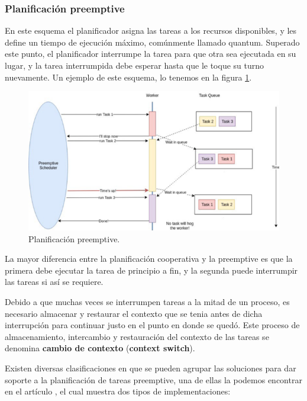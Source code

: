 \subsubsection{Planificación preemptive}

En este esquema el planificador asigna las tareas a los recursos disponibles, y les define un tiempo de ejecución máximo, comúnmente llamado quantum\cite{PreeK}. Superado este punto, el planificador interrumpe la tarea para que otra sea ejecutada en su lugar, y la tarea interrumpida debe esperar hasta que le toque su turno nuevamente. Un ejemplo de este esquema, lo tenemos en la figura \ref{fig:schedpree}.

  \begin{figure}[ht]
      \centering
        \includegraphics[scale=1]{img/schedPre}
        \caption{Planificación preemptive.\cite{medium}}
        \label{fig:schedpree}
    \end{figure}

La mayor diferencia entre la planificación cooperativa y la preemptive es que la primera debe ejecutar la tarea de principio a fin, y la segunda puede interrumpir las tareas si así se requiere.
    
Debido a que muchas veces se interrumpen tareas a la mitad de un proceso, es necesario almacenar y restaurar el contexto que se tenia antes de dicha interrupción para continuar justo en el punto en donde se quedó. Este proceso de almacenamiento, intercambio y restauración del contexto de las tareas se denomina \textbf{cambio de contexto} (\textbf{context switch}).

\label{claspree}
Existen diversas clasificaciones en que se pueden agrupar las soluciones para dar soporte a la planificación de tareas preemptive, una de ellas la podemos encontrar en el artículo \cite{GPUArt}, el cual muestra dos tipos de implementaciones:

